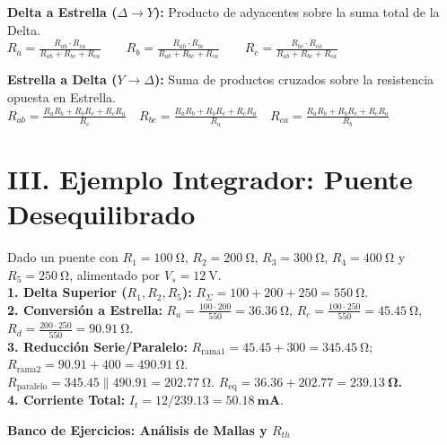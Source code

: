\documentclass[11pt, a4paper]{article}
\begin{document}
\begin{tcolorbox}[caja_teoria, title=Reglas Mnemotécnicas Canónicas]
\textbf{Delta a Estrella ($\Delta \to Y$):} Producto de adyacentes sobre la suma total de la Delta.\\
$R_a = \frac{R_{ab} \cdot R_{ca}}{R_{ab} + R_{bc} + R_{ca}} \quad \quad R_b = \frac{R_{ab} \cdot R_{bc}}{R_{ab} + R_{bc} + R_{ca}} \quad \quad R_c = \frac{R_{bc} \cdot R_{ca}}{R_{ab} + R_{bc} + R_{ca}}$

\vspace{0.2cm}
\textbf{Estrella a Delta ($Y \to \Delta$):} Suma de productos cruzados sobre la resistencia opuesta en Estrella.\\
$R_{ab} = \frac{R_a R_b + R_b R_c + R_c R_a}{R_c} \quad R_{bc} = \frac{R_a R_b + R_b R_c + R_c R_a}{R_a} \quad R_{ca} = \frac{R_a R_b + R_b R_c + R_c R_a}{R_b}$
\end{tcolorbox}

\section*{III. Ejemplo Integrador: Puente Desequilibrado}
Dado un puente con $R_1 = \qty{100}{\ohm}$, $R_2 = \qty{200}{\ohm}$, $R_3 = \qty{300}{\ohm}$, $R_4 = \qty{400}{\ohm}$ y $R_5 = \qty{250}{\ohm}$, alimentado por $V_s = \qty{12}{\volt}$. \\
\textbf{1. Delta Superior ($R_1, R_2, R_5$):} $R_\Sigma = 100 + 200 + 250 = \qty{550}{\ohm}$. \\
\textbf{2. Conversión a Estrella:}
$R_a = \frac{100 \cdot 200}{550} = \qty{36.36}{\ohm}$, $R_c = \frac{100 \cdot 250}{550} = \qty{45.45}{\ohm}$, $R_d = \frac{200 \cdot 250}{550} = \qty{90.91}{\ohm}$. \\
\textbf{3. Reducción Serie/Paralelo:}
$R_{\text{rama1}} = 45.45 + 300 = \qty{345.45}{\ohm}$; \quad $R_{\text{rama2}} = 90.91 + 400 = \qty{490.91}{\ohm}$. \\
$R_{\text{paralelo}} = 345.45 \parallel 490.91 = \qty{202.77}{\ohm}$. \quad \textbf{$R_{\text{eq}} = 36.36 + 202.77 = \mathbf{\qty{239.13}{\ohm}}$.} \\
\textbf{4. Corriente Total:} $I_t = 12 / 239.13 = \mathbf{\qty{50.18}{\milli\ampere}}$.

\newpage
\begin{center}
    {\LARGE \textbf{Banco de Ejercicios: Análisis de Mallas y $R_{th}$}}
\end{center}
\vspace{0.3cm}
\end{document}

